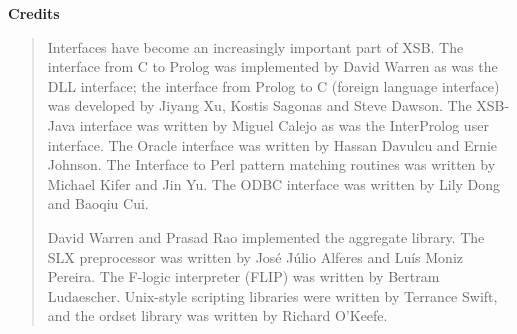
\begin{center}
{\bf {\Large 
		Credits
}}
\end{center}


\begin{quote}
Interfaces have become an increasingly important part of XSB.  The
interface from C to Prolog was implemented by David Warren as was the
DLL interface; the interface from Prolog to C (foreign language
interface) was developed by Jiyang Xu, Kostis Sagonas and Steve
Dawson.  The XSB-Java interface was written by Miguel Calejo as was
the InterProlog user interface.  The Oracle interface was written by
Hassan Davulcu and Ernie Johnson.  The Interface to Perl pattern
matching routines was written by Michael Kifer and Jin Yu.  The ODBC
interface was written by Lily Dong and Baoqiu Cui.

David Warren and Prasad Rao implemented the aggregate library.  The
SLX preprocessor was written by Jos\'e J\'ulio Alferes and Lu\'is
Moniz Pereira.  The F-logic interpreter (FLIP) was written by Bertram
Ludaescher.  Unix-style scripting libraries were written by
Terrance Swift, and the ordset library was written by Richard O'Keefe.
\end{quote}
